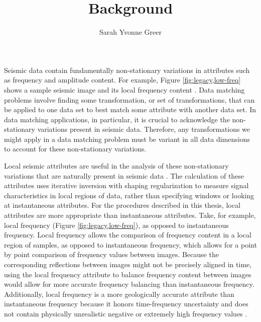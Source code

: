 \title{Background}
\author{Sarah Yvonne Greer}
\maketitle
{}
Seismic data contain fundamentally non-stationary variations in attributes such as frequency and amplitude content.
For example, Figure \ref{fig:legacy,low-freq} shows a sample seismic image and its local frequency content \cite[]{locfreq}.
Data matching problems involve finding some transformation, or set of transformations, that can be applied to one data set to best match some attribute with another data set.
In data matching applications, in particular, it is crucial to acknowledge the non-stationary variations present in seismic data.
Therefore, any transformations we might apply in a data matching problem must be variant in all data dimensions to account for these non-stationary variations.

Local seismic attributes are useful in the analysis of these non-stationary variations that are naturally present in seismic data \cite{attr}.
The calculation of these attributes uses iterative inversion with shaping regularization \cite{shap} to measure signal characteristics in local regions of data, rather than specifying windows or looking at instantaneous attributes.
For the procedures described in this thesis, local attributes are more appropriate than instantaneous attributes.
Take, for example, local frequency (Figure \ref{fig:legacy,low-freq}), as opposed to instantaneous frequency.
Local frequency allows the comparison of frequency content in a local region of samples, as opposed to instantaneous frequency, which allows for a point by point comparison of frequency values between images. 
Because the corresponding reflections between images might not be precisely aligned in time, using the local frequency attribute to balance frequency content between images would allow for more accurate frequency balancing than instantaneous frequency. 
Additionally, local frequency is a more geologically accurate attribute than instantaneous frequency because it honors time-frequency uncertainty and does not contain physically unrealistic negative or extremely high frequency values \cite[]{attr}.


